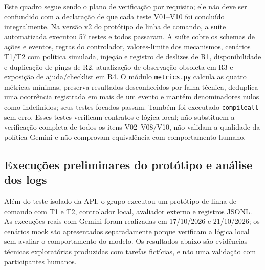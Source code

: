 \documentclass[conference]{IEEEtran}
\begin{document}
Este quadro segue sendo o plano de verificação por requisito; ele não deve ser confundido com a declaração de que cada teste V01--V10 foi concluído integralmente. Na versão v2 do protótipo de linha de comando, a suíte automatizada executou 57 testes e todos passaram. A suíte cobre os schemas de ações e eventos, regras do controlador, valores-limite dos mecanismos, cenários T1/T2 com política simulada, injeção e registro de deslizes de R1, disponibilidade e duplicação de pings de R2, atualização de observação obsoleta em R3 e exposição de ajuda/checklist em R4. O módulo \texttt{metrics.py} calcula as quatro métricas mínimas, preserva resultados desconhecidos por falha técnica, deduplica uma ocorrência registrada em mais de um evento e mantém denominadores nulos como indefinidos; seus testes focados passam. Também foi executado \texttt{compileall} sem erro. Esses testes verificam contratos e lógica local; não substituem a verificação completa de todos os itens V02--V08/V10, não validam a qualidade da política Gemini e não comprovam equivalência com comportamento humano.

\subsection{Execuções preliminares do protótipo e análise dos logs}

Além do teste isolado da API, o grupo executou um protótipo de linha de comando com T1 e T2, controlador local, avaliador externo e registros JSONL. As execuções reais com Gemini foram realizadas em 17/10/2026 e 21/10/2026; os cenários mock são apresentados separadamente porque verificam a lógica local sem avaliar o comportamento do modelo. Os resultados abaixo são evidências técnicas exploratórias produzidas com tarefas fictícias, e não uma validação com participantes humanos.
\end{document}
